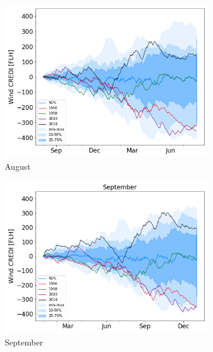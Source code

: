 \documentclass[a4paper,11pt]{extarticle}
\begin{document}
\begin{figure}[b]
\begin{subfigure}[t]{0.32\linewidth}
    \includegraphics[width=\linewidth]{Fig_CUMSUM_YearStart_August}
    \caption{August }
\end{subfigure}
\begin{subfigure}[t]{0.32\linewidth}
    \includegraphics[width=\linewidth]{Fig_CUMSUM_YearStart_September}
    \caption{September }
\end{subfigure}
\begin{subfigure}[t]{0.32\linewidth}

\end{subfigure}
\end{figure}
\end{document}
